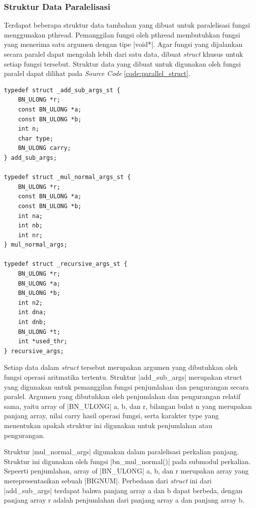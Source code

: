     \subsubsection{Struktur Data Paralelisasi}
    Terdapat beberapa struktur data tambahan yang dibuat untuk paralelisasi fungsi menggunakan pthread. Pemanggilan fungsi oleh pthread membutuhkan fungsi yang menerima satu argumen dengan tipe |void*|. Agar fungsi yang dijalankan secara paralel dapat mengolah lebih dari satu data, dibuat \textit{struct} khusus untuk setiap fungsi tersebut. Struktur data yang dibuat untuk digunakan oleh fungsi paralel dapat dilihat pada \textit{Source Code} \ref{code:parallel_struct}.

    \begin{lstlisting}[caption={Struktur Data Paralelisasi},captionpos=b, label={code:parallel_struct}]
typedef struct _add_sub_args_st {
    BN_ULONG *r;
    const BN_ULONG *a;
    const BN_ULONG *b;
    int n;
    char type;
    BN_ULONG carry;
} add_sub_args;

typedef struct _mul_normal_args_st {
    BN_ULONG *r;
    const BN_ULONG *a;
    const BN_ULONG *b;
    int na;
    int nb;
    int nr;
} mul_normal_args;

typedef struct _recursive_args_st {
    BN_ULONG *r;
    BN_ULONG *a;
    BN_ULONG *b;
    int n2;
    int dna;
    int dnb;
    BN_ULONG *t;
    int *used_thr;
} recursive_args;
    \end{lstlisting}

    Setiap data dalam \textit{struct} tersebut merupakan argumen yang dibutuhkan oleh fungsi operasi aritmatika tertentu. Struktur |add_sub_args| merupakan struct yang digunakan untuk pemanggilan fungsi penjumlahan dan pengurangan secara paralel. Argumen yang dibutuhkan oleh penjumlahan dan pengurangan relatif sama, yaitu array of |BN_ULONG| a, b, dan r, bilangan bulat n yang merupakan panjang array, nilai carry hasil operasi fungsi, serta karakter type yang menentukan apakah struktur ini digunakan untuk penjumlahan atau pengurangan.

    Struktur |mul_normal_args| digunakan dalam paralelisasi perkalian panjang. Struktur ini digunakan oleh fungsi |bn_mul_normal()| pada submodul perkalian. Sepeerti penjumlahan, array of |BN_ULONG| a, b, dan r merupakan array yang merepresentasikan sebuah |BIGNUM|. Perbedaan dari \textit{struct} ini dari |add_sub_args| terdapat bahwa panjang array a dan b dapat berbeda, dengan panjang array r adalah penjumlahan dari panjang array a dan panjang array b.

